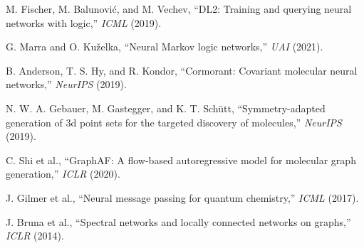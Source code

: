 \documentclass{article}
\begin{document}
\begin{thebibliography}{99}
 M. Fischer, M. Balunovi\'{c}, and M. Vechev, ``DL2: Training and querying neural networks with logic,'' \emph{ICML} (2019).

 G. Marra and O. Kuželka, ``Neural Markov logic networks,'' \emph{UAI} (2021).

 B. Anderson, T. S. Hy, and R. Kondor, ``Cormorant: Covariant molecular neural networks,'' \emph{NeurIPS} (2019).

 N. W. A. Gebauer, M. Gastegger, and K. T. Sch\"{u}tt, ``Symmetry-adapted generation of 3d point sets for the targeted discovery of molecules,'' \emph{NeurIPS} (2019).

 C. Shi et al., ``GraphAF: A flow-based autoregressive model for molecular graph generation,'' \emph{ICLR} (2020).

 J. Gilmer et al., ``Neural message passing for quantum chemistry,'' \emph{ICML} (2017).

 J. Bruna et al., ``Spectral networks and locally connected networks on graphs,'' \emph{ICLR} (2014).

\end{thebibliography}
\end{document}
